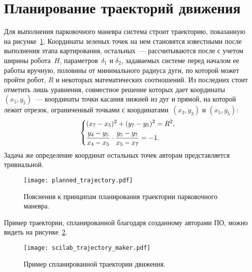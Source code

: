 \newpage
\section{Планирование траекторий движения}
Для выполнения парковочного маневра система строит траекторию, показанную на рисунке~\ref{img_planned_trajectory}.
Координаты зеленых точек на нем становятся известными после выполнения этапа картирования, остальных~--- рассчитываются после с учетом ширины робота~$H$, параметров~$\delta_1$ и $\delta_2$, задаваемых системе перед началом ее работы вручную, половины от минимального радиуса дуги, по которой может пройти робот, $R$ и некоторых математических соотношений.
Из последних стоит отметить лишь уравнения, совместное решение которых дает координаты $(x_5, y_5)$~--- координаты точки касания нижней из дуг и прямой, на которой лежит отрезок, ограниченный точками с координатами~$(x_3, y_3)$ и $(x_5, y_5)$:
\begin{equation}
    \left\{
    \begin{aligned}
        & (x_7 - x_5)^2 + (y_7 - y_5)^2 = R^2, \\
        & \frac{y_4 - y_5}{x_4 - x_5} \cdot \frac{y_5 - y_7}{x_5 - x_7} = -1 \ldotp
    \end{aligned}
    \right.
\end{equation}
Задача же определение координат остальных точек авторам представляется тривиальной.

\begin{figure}[h!]
    \centering
    \texttt{[image: planned\_trajectory.pdf]}
    \vspace{0cm}
    \caption{Пояснения к принципам планирования траектории парковочного маневра.}
    \label{img_planned_trajectory}
\end{figure}

Пример траектории, спланированной благодаря созданному авторами ПО, можно видеть на рисунке~\ref{img_scilab_trajectory_maker}.

\begin{figure}[h!]
    \centering
    \texttt{[image: scilab\_trajectory\_maker.pdf]}
    \caption{Пример спланированной траектории движения.}
    \label{img_scilab_trajectory_maker}
\end{figure}

\newpage \mbox{} \newpage